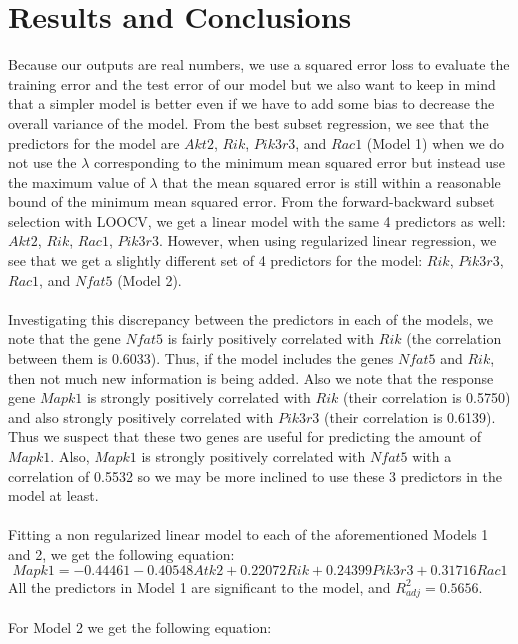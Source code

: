 \documentclass{article}
\begin{document}
\section{Results and Conclusions}
Because our outputs are real numbers, we use a squared error loss to evaluate the training error and the test error of our model but we also want to keep in mind that a simpler model is better even if we have to add some bias to decrease the overall variance of the model.  From the best subset regression, we see that the predictors for the model are $Akt2$, $Rik$, $Pik3r3$, and $Rac1$ (Model 1) when we do not use the $\lambda$ corresponding to the minimum mean squared error but instead use the maximum value of $\lambda$ that the mean squared error is still within a reasonable bound of the minimum mean squared error.  From the forward-backward subset selection with LOOCV, we get a linear model with the same 4 predictors as well: $Akt2$, $Rik$, $Rac1$, $Pik3r3$.  However, when using regularized linear regression, we see that we get a slightly different set of 4 predictors for the model: $Rik$, $Pik3r3$, $Rac1$, and $Nfat5$ (Model 2).  \\
\null\\
Investigating this discrepancy between the predictors in each of the models, we note that the gene $Nfat5$ is fairly positively correlated with $Rik$ (the correlation between them is 0.6033).  Thus, if the model includes the genes $Nfat5$ and $Rik$, then not much new information is being added.  Also we note that the response gene $Mapk1$ is strongly positively correlated with $Rik$ (their correlation is 0.5750) and also strongly positively correlated with $Pik3r3$ (their correlation is 0.6139).  Thus we suspect that these two genes are useful for predicting the amount of $Mapk1$.  Also, $Mapk1$ is strongly positively correlated with $Nfat5$ with a correlation of  0.5532 so we may be more inclined to use these 3 predictors in the model at least. \\
\null\\
Fitting a non regularized linear model to each of the aforementioned Models 1 and 2, we get the following equation:
\begin{equation}
	Mapk1 = -0.44461-0.40548Atk2+0.22072Rik+0.24399Pik3r3+0.31716Rac1
	\label{eq:Model1}
\end{equation}
All the predictors in Model 1 are significant to the model, and $R^2_{adj}=0.5656$.\\
\null\\
For Model 2 we get the following equation:
\end{document}
